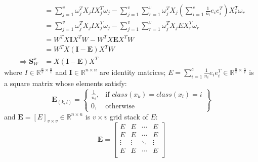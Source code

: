 \begin{appendix}
\begin{equation}
\begin{split}
            &= \sum_{j=1}^{v}\omega_j^T X_j I X_j^T\omega_j - \sum_{j=1}^{v}\sum_{r=1}^{v}\omega_j^T X_j\left(\sum_{i=1}^{c}\frac{1}{n_i}e_i e_i^T\right)X_r^T\omega_r \\
            &= \sum_{j=1}^{v}\omega_j^T X_j I X_j^T\omega_j - \sum_{j=1}^{v}\sum_{r=1}^{v}\omega_j^T X_j E X_r^T\omega_r \\
            &= W^T X \boldsymbol{I} X^T W - W^T X \boldsymbol{E} X^T W \\
            &= W^T X \left(\boldsymbol{I} - \boldsymbol{E}\right) X^T W \\
            \Rightarrow \boldsymbol{S}^x_W &= X \left(\boldsymbol{I} - \boldsymbol{E}\right) X^T
        \end{split}
        \label{eq:mvda_Sw_derivation}
    \end{equation}
    where $I \in \mathbb{R}^{\frac{n}{v}\times \frac{n}{v}}$ and $\boldsymbol{I} \in \mathbb{R}^{n\times n}$ are identity matrices; $E = \sum_{i=1}^{c}\frac{1}{n_i}e_i e_i^T \in \mathbb{R}^{\frac{n}{v}\times \frac{n}{v}}$ is a square matrix whose elements satisfy:
    \begin{equation}
        \boldsymbol{E}_{(k,l)} = \left\{\begin{array}{lr}
            \frac{1}{n_i}, & \text{if } class(x_k) = class(x_l) = i\\
            0, & \text{otherwise}
            \end{array}\right\}
    \end{equation}
    and $\boldsymbol{E} = \left[E\right]_{v\times v} \in \mathbb{R}^{n\times n}$ is $v \times v$ grid stack of $E$:
    \begin{equation}
        \boldsymbol{E} = \left[\begin{matrix}E&E&\cdots&E\\E&E&\cdots&E\\\vdots&\vdots&\ddots&\vdots\\E&E&\cdots&E\\\end{matrix}\right]
    \end{equation}


\end{appendix}
